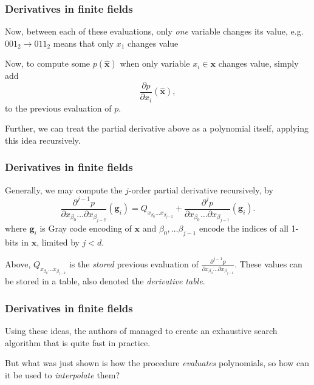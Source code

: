 \documentclass{beamer}
\begin{document}
\begin{frame}
    \frametitle{Derivatives in finite fields}
    Now, between each of these evaluations, only \textit{one} variable changes its value, e.g. $001_2 \rightarrow 011_2$ means that only $x_1$ changes value

    \pause

    Now, to compute some $p(\hat{\mathbf{x}})$ when only variable $x_i \in \mathbf{x}$ changes value, simply add 
    $$
        \frac{\partial p}{\partial x_i}(\hat{\mathbf{x}}),
    $$
    to the previous evaluation of $p$. 

    \pause
    
    Further, we can treat the partial derivative above as a polynomial itself, applying this idea recursively.
\end{frame}

\begin{frame}
    \frametitle{Derivatives in finite fields}
    Generally, we may compute the $j$-order partial derivative recursively, by 
    $$
        \frac{\partial^{j - 1} p}{\partial x_{\beta_0} \dots \partial x_{\beta_{j - 2}}}(\mathbf{g}_i) = Q_{x_{\beta_0} \dots x_{\beta_{j - 2}}} + \frac{\partial^j p}{\partial x_{\beta_0} \dots \partial x_{\beta_{j - 1}}}(\mathbf{g}_i).
    $$
    where $\mathbf{g}_i$ is Gray code encoding of $\mathbf{x}$ and $\beta_0, \dots \beta_{j - 1}$ encode the indices of all 1-bits in $\mathbf{x}$, limited by $j < d$.
    
    Above, $Q_{x_{\beta_0} \dots x_{\beta_{j - 2}}}$ is the \textit{stored} previous evaluation of $\frac{\partial^{j - 1} p}{\partial x_{\beta_0} \dots \partial x_{\beta_{j - 2}}}$. These values can be stored in a table, also denoted the \textit{derivative table}.
\end{frame}

\begin{frame}
    \frametitle{Derivatives in finite fields}
    Using these ideas, the authors of \cite{ches-2010-23990} managed to create an exhaustive search algorithm that is quite fast in practice.

    But what was just shown is how the procedure \textit{evaluates} polynomials, so how can it be used to \textit{interpolate} them?
\end{frame}
\end{document}
